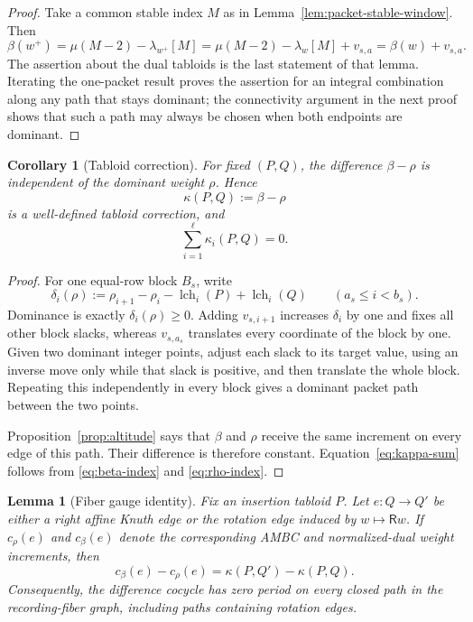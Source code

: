 \documentclass[11pt]{article}
\newtheorem{lemma}[theorem]{Lemma}
\newtheorem{corollary}[theorem]{Corollary}
\theoremstyle{definition}
\theoremstyle{remark}
\newcommand{\lch}{\operatorname{lch}}
\newcommand{\Rop}{\mathsf R}
\begin{document}
\begin{proof}
Take a common stable index \(M\) as in Lemma~\ref{lem:packet-stable-window}.  Then
\[
 \beta(w^+)
 =\mu(M-2)-\lambda_{w^+}[M]
 =\mu(M-2)-\lambda_w[M]+v_{s,a}
 =\beta(w)+v_{s,a}.
\]
The assertion about the dual tabloids is the last statement of that lemma.  Iterating
the one-packet result proves the assertion for an integral combination along any path
that stays dominant; the connectivity argument in the next proof shows that such a path
may always be chosen when both endpoints are dominant.
\end{proof}

\begin{corollary}[Tabloid correction]\label{cor:kappa-independent}
For fixed \((P,Q)\), the difference \(\beta-\rho\) is independent of the dominant weight
\(\rho\).  Hence
\begin{equation}\label{eq:kappa}
                         \kappa(P,Q):=\beta-\rho
\end{equation}
is a well-defined tabloid correction, and
\begin{equation}\label{eq:kappa-sum}
                         \sum_{i=1}^{\ell}\kappa_i(P,Q)=0.
\end{equation}
\end{corollary}

\begin{proof}
For one equal-row block \(B_s\), write
\[
 \delta_i(\rho):=\rho_{i+1}-\rho_i-\lch_i(P)+\lch_i(Q)
 \qquad(a_s\le i<b_s).
\]
Dominance is exactly \(\delta_i(\rho)\ge0\).  Adding \(v_{s,i+1}\) increases
\(\delta_i\) by one and fixes all other block slacks, whereas \(v_{s,a_s}\) translates
every coordinate of the block by one.  Given two dominant integer points, adjust each
slack to its target value, using an inverse move only while that slack is positive, and
then translate the whole block.  Repeating this independently in every block gives a
dominant packet path between the two points.

Proposition~\ref{prop:altitude} says that \(\beta\) and \(\rho\) receive the same
increment on every edge of this path.  Their difference is therefore constant.
Equation~\eqref{eq:kappa-sum} follows from \eqref{eq:beta-index} and
\eqref{eq:rho-index}.
\end{proof}

\begin{lemma}[Fiber gauge identity]\label{lem:fiber-gauge}
Fix an insertion tabloid \(P\).  Let \(e:Q\to Q'\) be either a right affine Knuth
edge or the rotation edge induced by \(w\mapsto\Rop w\).  If
\(c_\rho(e)\) and \(c_\beta(e)\) denote the corresponding AMBC and normalized-dual
weight increments, then
\begin{equation}\label{eq:fiber-gauge}
 c_\beta(e)-c_\rho(e)=\kappa(P,Q')-\kappa(P,Q).
\end{equation}
Consequently, the difference cocycle has zero period on every closed path in the
recording-fiber graph, including paths containing rotation edges.
\end{lemma}
\end{document}
